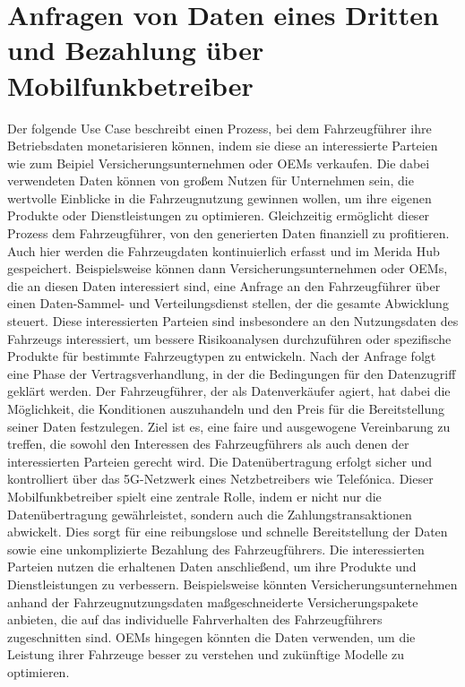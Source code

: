 \section{Anfragen von Daten eines Dritten und Bezahlung über Mobilfunkbetreiber}
Der folgende Use Case beschreibt einen Prozess, bei dem Fahrzeugführer ihre Betriebsdaten monetarisieren können, indem sie diese an interessierte Parteien wie zum Beipiel Versicherungsunternehmen oder OEMs verkaufen. Die dabei verwendeten Daten können von großem Nutzen für Unternehmen sein, die wertvolle Einblicke in die Fahrzeugnutzung gewinnen wollen, um ihre eigenen Produkte oder Dienstleistungen zu optimieren. Gleichzeitig ermöglicht dieser Prozess dem Fahrzeugführer, von den generierten Daten finanziell zu profitieren.
\newline
Auch hier werden die Fahrzeugdaten kontinuierlich erfasst und im Merida Hub gespeichert. Beispielsweise können dann Versicherungsunternehmen oder OEMs, die an diesen Daten interessiert sind, eine Anfrage an den Fahrzeugführer über einen Daten-Sammel- und Verteilungsdienst stellen, der die gesamte Abwicklung steuert. Diese interessierten Parteien sind insbesondere an den Nutzungsdaten des Fahrzeugs interessiert, um bessere Risikoanalysen durchzuführen oder spezifische Produkte für bestimmte Fahrzeugtypen zu entwickeln.
\newline
\newline
Nach der Anfrage folgt eine Phase der Vertragsverhandlung, in der die Bedingungen für den Datenzugriff geklärt werden. Der Fahrzeugführer, der als Datenverkäufer agiert, hat dabei die Möglichkeit, die Konditionen auszuhandeln und den Preis für die Bereitstellung seiner Daten festzulegen. Ziel ist es, eine faire und ausgewogene Vereinbarung zu treffen, die sowohl den Interessen des Fahrzeugführers als auch denen der interessierten Parteien gerecht wird.
\newline
Die Datenübertragung erfolgt sicher und kontrolliert über das 5G-Netzwerk eines Netzbetreibers wie Telefónica. Dieser Mobilfunkbetreiber spielt eine zentrale Rolle, indem er nicht nur die Datenübertragung gewährleistet, sondern auch die Zahlungstransaktionen abwickelt. Dies sorgt für eine reibungslose und schnelle Bereitstellung der Daten sowie eine unkomplizierte Bezahlung des Fahrzeugführers.
\newline
Die interessierten Parteien nutzen die erhaltenen Daten anschließend, um ihre Produkte und Dienstleistungen zu verbessern. Beispielsweise könnten Versicherungsunternehmen anhand der Fahrzeugnutzungsdaten maßgeschneiderte Versicherungspakete anbieten, die auf das individuelle Fahrverhalten des Fahrzeugführers zugeschnitten sind. OEMs hingegen könnten die Daten verwenden, um die Leistung ihrer Fahrzeuge besser zu verstehen und zukünftige Modelle zu optimieren.
